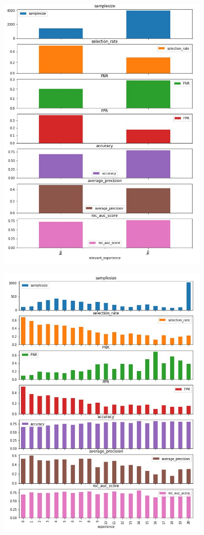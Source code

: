 \begin{figure}
    \centering
\includegraphics[width=0.9\textwidth]{relevant_ex.JPG}
    \label{fig: 2}
\end{figure}
\begin{figure}
    \centering
\includegraphics[width=0.9\textwidth]{experience.JPG}
    \label{fig: 2}
\end{figure}

